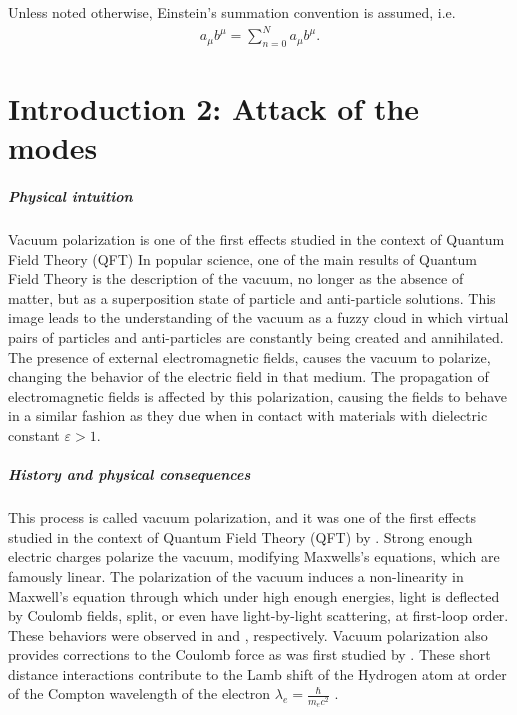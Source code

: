 Unless noted otherwise, Einstein's summation convention is assumed, i.e. 
\begin{align}
	a_\mu b^{\mu}= \sum_{n=0}^{N} a_\mu b^{\mu}.
\end{align}



\chapter{Introduction 2: Attack of the modes}

\paragraph{Physical intuition}
Vacuum polarization is one of the first effects studied in the context of Quantum Field Theory (QFT)
In popular science, one of the main results of Quantum Field Theory is the description of the vacuum, no longer as the absence of matter, but as a superposition state of particle and anti-particle solutions.
This image leads to the understanding of the vacuum as a fuzzy cloud in which virtual pairs of particles and anti-particles are constantly being created and annihilated. The presence of external electromagnetic fields, causes the vacuum to polarize, changing the behavior of the electric field in that medium. The propagation of electromagnetic fields is affected by this polarization, causing the fields to behave in a similar fashion as they due when in contact with materials with dielectric constant $\varepsilon > 1$.

\paragraph{History and physical consequences}
This process is called vacuum polarization, and it was one of the first effects studied in the context of Quantum Field Theory (QFT)
 by \cite{Eule1935, Heis1936, Uehl1935}. Strong enough electric charges polarize the vacuum, modifying Maxwells's equations, which are famously linear. The polarization of the vacuum induces a non-linearity in Maxwell's equation through which under high enough energies, light is deflected by Coulomb fields, split, or even have light-by-light scattering, at first-loop order. These behaviors were observed in \cite{Jarl1973} and \cite{ATLAS:2016pab}, respectively. Vacuum polarization also provides corrections to the Coulomb force as was first studied by \cite{Uehl1935}. These short distance interactions contribute to the Lamb shift of the Hydrogen atom at order of the Compton wavelength of the electron $\lambda_e = \frac{\hbar}{m_e c^2}$ .

